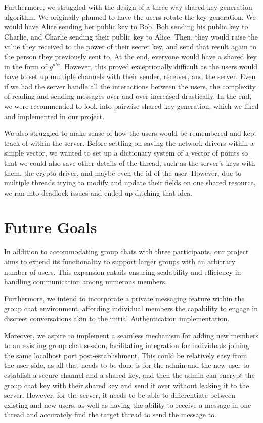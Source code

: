 \documentclass[sigconf]{acmart}
\begin{document}
Furthermore, we struggled with the design of a three-way shared key generation algorithm. We originally planned to have the users rotate the key generation. We would have Alice sending her public key to Bob, Bob sending his public key to Charlie, and Charlie sending their public key to Alice. Then, they would raise the value they received to the power of their secret key, and send that result again to the person they previously sent to. At the end, everyone would have a shared key in the form of $g^{abc}$. However, this proved exceptionally difficult as the users would have to set up multiple channels with their sender, receiver, and the server. Even if we had the server handle all the interactions between the users, the complexity of reading and sending messages over and over increased drastically. In the end, we were recommended to look into pairwise shared key generation, which we liked and implemented in our project.
 
We also struggled to make sense of how the users would be remembered and kept track of within the server. Before settling on saving the network drivers within a simple vector, we wanted to set up a dictionary system of a vector of points so that we could also save other details of the thread, such as the server's keys with them, the crypto driver, and maybe even the id of the user. However, due to multiple threads trying to modify and update their fields on one shared resource, we ran into deadlock issues and ended up ditching that idea. 

\section{Future Goals}
In addition to accommodating group chats with three participants, our project aims to extend its functionality to support larger groups with an arbitrary number of users. This expansion entails ensuring scalability and efficiency in handling communication among numerous members. 

Furthermore, we intend to incorporate a private messaging feature within the group chat environment, affording individual members the capability to engage in discreet conversations akin to the initial Authentication implementation. 

Moreover, we aspire to implement a seamless mechanism for adding new members to an existing group chat session, facilitating integration for individuals joining the same localhost port post-establishment. This could be relatively easy from the user side, as all that needs to be done is for the admin and the new user to establish a secure channel and a shared key, and then the admin can encrypt the group chat key with their shared key and send it over without leaking it to the server. However, for the server, it needs to be able to differentiate between existing and new users, as well as having the ability to receive a message in one thread and accurately find the target thread to send the message to. 
\end{document}
